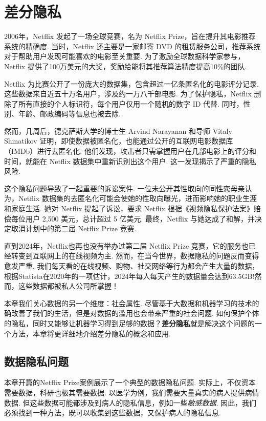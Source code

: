 \chapter{差分隐私}\label{chap:differential-privacy}

2006年，Netflix 发起了一场全球竞赛，名为 Netflix Prize，旨在提升其电影推荐系统的精确度. 当时，Netflix 还主要是一家邮寄 DVD 的租赁服务公司，推荐系统对于帮助用户发现可能喜欢的电影至关重要. 为了激励全球数据科学家参与，Netflix 提供了100万美元的大奖，奖励给能将其推荐算法精度提高10\%的团队. 

Netflix 为比赛公开了一份庞大的数据集，包含超过一亿条匿名化的电影评分记录. 这些数据来自近五十万名用户，涉及约一万八千部电影. 为了保护隐私，Netflix 删除了所有直接的个人标识符，每个用户仅用一个随机的数字 ID 代替. 同时，性别、年龄、邮政编码等信息也被去除. 

然而，几周后，德克萨斯大学的博士生 Arvind Narayanan 和导师 Vitaly Shmatikov 证明，即使数据被匿名化，也能通过公开的互联网电影数据库（IMDb）进行去匿名化. 他们发现，攻击者只需掌握用户在几部电影上的评分和时间，就能在 Netflix 数据集中重新识别出这个用户. 这一发现揭示了严重的隐私风险. 

这个隐私问题导致了一起重要的诉讼案件. 一位未公开其性取向的同性恋母亲认为，Netflix 数据集的去匿名化可能会使她的性取向曝光，进而影响她的职业生涯和家庭生活. 她对 Netflix 提起了诉讼，要求 Netflix 根据《视频隐私保护法案》赔偿每位用户 2,500 美元，总计超过 5 亿美元. 最终，Netflix 与她达成了和解，并决定取消计划中的第二届 Netflix Prize 竞赛. 

直到2024年，Netflix也再也没有举办过第二届 Netflix Prize 竞赛，它的服务也已经转变到互联网上的在线视频为主. 然而，在当今世界，数据隐私的问题反而变得愈发严重. 我们每天看的在线视频、购物、社交网络等行为都会产生大量的数据，根据Statista在2020年的一项估计，2024年每人每天产生的数据量会达到63.5GB!然而，这些数据都被私人公司所掌握！

本章我们关心数据的另一个维度：社会属性. 尽管基于大数据和机器学习的技术的确改善了我们的生活，但是对数据的滥用也会带来严重的社会问题. 如何保护个体的隐私，同时又能够让机器学习得到足够的数据？\textbf{差分隐私}就是解决这个问题的一个方法，本章将更详细地介绍差分隐私的概念和应用. 

\section{数据隐私问题}

本章开篇的Netflix Prize案例展示了一个典型的数据隐私问题. 实际上，不仅资本需要数据，科研也极其需要数据. 以医学为例，我们需要大量真实的病人提供病情数据. 但这些数据可能都涉及到病人的隐私信息，例如一些\textit{敏感数据}. 因此，我们必须找到一种方法，既可以收集到这些数据，又保护病人的隐私信息.

